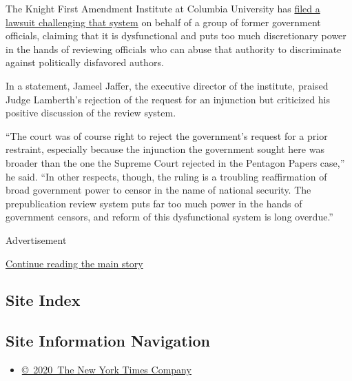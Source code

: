 The Knight First Amendment Institute at Columbia University has
\href{https://www.nytimes.com/2019/04/02/us/politics/prepublication-censorship-system.html}{filed
a lawsuit challenging that system} on behalf of a group of former
government officials, claiming that it is dysfunctional and puts too
much discretionary power in the hands of reviewing officials who can
abuse that authority to discriminate against politically disfavored
authors.

In a statement, Jameel Jaffer, the executive director of the institute,
praised Judge Lamberth's rejection of the request for an injunction but
criticized his positive discussion of the review system.

``The court was of course right to reject the government's request for a
prior restraint, especially because the injunction the government sought
here was broader than the one the Supreme Court rejected in the Pentagon
Papers case,'' he said. ``In other respects, though, the ruling is a
troubling reaffirmation of broad government power to censor in the name
of national security. The prepublication review system puts far too much
power in the hands of government censors, and reform of this
dysfunctional system is long overdue.''

Advertisement

\protect\hyperlink{after-bottom}{Continue reading the main story}

\hypertarget{site-index}{%
\subsection{Site Index}\label{site-index}}

\hypertarget{site-information-navigation}{%
\subsection{Site Information
Navigation}\label{site-information-navigation}}

\begin{itemize}
\tightlist
\item
  \href{https://help.nytimes.com/hc/en-us/articles/115014792127-Copyright-notice}{©~2020~The
  New York Times Company}
\end{itemize}

